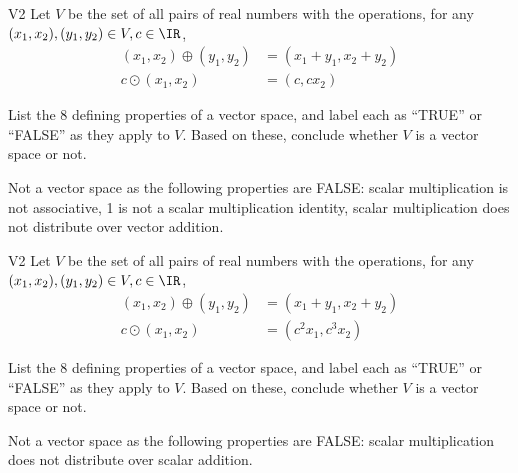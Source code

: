  \begin{problem}{V2}
 Let \(V\) be the set of all pairs of real numbers with the operations, for any \((x_1,x_2), (y_1,y_2) \in V,c \in \IR\),
 \begin{align*}
 (x_1,x_2) \oplus (y_1,y_2) &= (x_1+y_1,x_2+y_2) \\
 c \odot (x_1,x_2) &= (c, cx_2)
 \end{align*}

   List the 8 defining properties of a vector space, and label each as
   ``TRUE'' or ``FALSE'' as they apply to \(V\). Based on these, conclude whether
   \(V\) is a vector space or not.
 \end{problem}
 \begin{solution}
 Not a vector space as the following properties are FALSE: scalar multiplication is not associative, 1 is not a scalar multiplication identity, scalar multiplication does not distribute over vector addition.
 \end{solution}
%
%
 \begin{problem}{V2}
 Let \(V\) be the set of all pairs of real numbers with the operations, for any \((x_1,x_2), (y_1,y_2) \in V,c \in \IR\),
 \begin{align*}
 (x_1,x_2) \oplus (y_1,y_2) &= (x_1+y_1,x_2+y_2) \\
 c \odot (x_1,x_2) &= (c^2x_1, c^3x_2)
 \end{align*}

   List the 8 defining properties of a vector space, and label each as
   ``TRUE'' or ``FALSE'' as they apply to \(V\). Based on these, conclude whether
   \(V\) is a vector space or not.
 \end{problem}
 \begin{solution}
 Not a vector space as the following properties are FALSE: scalar multiplication does not distribute over scalar addition.
 \end{solution}
%
%
%
%
